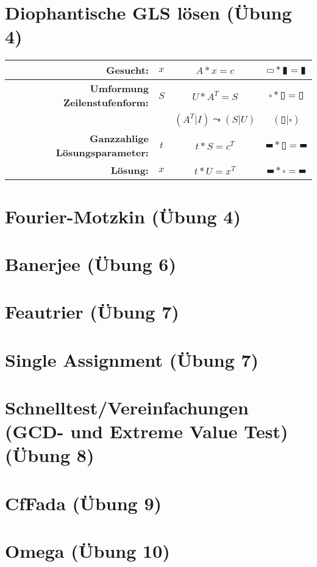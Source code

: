 \documentclass[a4paper,10pt]{article}
\begin{document}
% 

\section{Diophantische GLS lösen (Übung 4)}
\begin{center}
\begin{tabular}{rc|c|c}
\textbf{Gesucht:}                      & $x$   & $A * x = c$              & $\hrectangle * \vrectangleblack = \vrectangleblack$ \\
\hline
\textbf{Umformung Zeilenstufenform:}   & $S$   & $U * A^T = S$            & $\square * \vrectangle = \vrectangle$\\
                                       &       & $(A^T|I) \leadsto (S|U)$ & $(\vrectangle | \square)$ \\
\hline
\textbf{Ganzzahlige Lösungsparameter:} & $t$   & $t * S = c^T$            & $\hrectangleblack * \vrectangle = \hrectangleblack$ \\
\hline
\textbf{Lösung:}                       & $x$   & $t * U = x^T$              & $\hrectangleblack * \square = \hrectangleblack$ \\
\end{tabular}
\end{center}


\section{Fourier-Motzkin (Übung 4)}
\section{Banerjee (Übung 6)}
\section{Feautrier (Übung 7)}
\section{Single Assignment (Übung 7)}
\section{Schnelltest/Vereinfachungen (GCD- und Extreme Value Test) (Übung 8)}
\section{CfFada (Übung 9)}
\section{Omega (Übung 10)}
\end{document}
